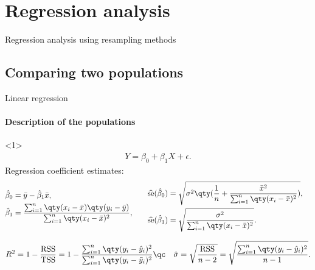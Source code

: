 \section{Regression analysis}
\begin{darkframes}
	\begin{frame}
		\huge Regression analysis using resampling methods
	\end{frame}
\end{darkframes}

\subsection{Comparing two populations}
\begin{frame}[label=intro-objectives]{Linear regression}
	\framesubtitle{Description of the populations}
	\begin{onlyenv}
		\begin{align}\label{eq:lm-model}
			Y = \beta_{0} + \beta_{1} X + \epsilon.
		\end{align}
		Regression coefficient estimates:
		\footnotesize
	    \begin{align*}
		    \begin{aligned}
		    	\hat{\beta}_{0} &= \bar{y} - \hat{\beta}_{1} \bar{x}, \\
		    	\hat{\beta}_{1} &= \frac{\sum_{i=1}^{n} \qty(x_{i} - \bar{x}) \qty(y_{i} - \bar{y})}{\sum_{i=1}^{n} \qty(x_{i} - \bar{x})^{2}},
		    \end{aligned}
			\qquad &
			\begin{aligned}
				\se{\hat{\beta}_{0}} &= \sqrt{ \sigma^{2} \qty(\frac{1}{n} + \frac{ \bar{x}^{2} }{ \sum_{i=1}^{n} \qty(x_{i} - \bar{x})^{2} } ) },
				\\
				\se{\hat{\beta}_{1}} &= \sqrt{ \frac{ \sigma^{2} }{ \sum_{i=1}^{n} \qty(x_{i} - \bar{x})^{2} } }.
			\end{aligned}
		\end{align*}

		\begin{align*}
			R^{2} = 1 - \frac{\text{RSS}}{\text{TSS}}
				  = 1 - \frac{\sum_{i=1}^{n} \qty(y_{i} - \hat{y}_{i})^{2}}{\sum_{i=1}^{n} \qty(y_{i} - \bar{y}_{i})^{2}}
			\qc \quad
			\hat{\sigma} = \sqrt{\frac{\text{RSS}}{n - 2}} = \sqrt{\frac{\sum_{i=1}^{n} \qty(y_{i} - \hat{y}_{i})^{2}}{n-1}}.
		\end{align*}
	\end{onlyenv}


\end{frame}

